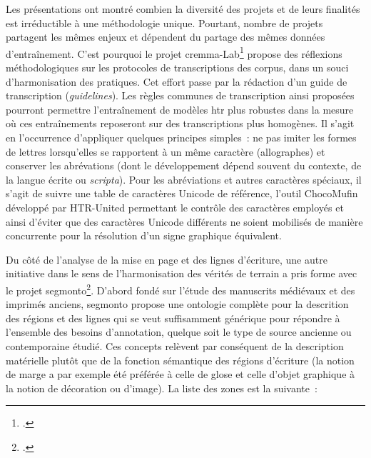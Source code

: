 \documentclass[a4paper,12pt,twoside]{book}
\begin{document}
				Les présentations ont montré combien la diversité des projets et de
				leurs finalités est irréductible à une méthodologie unique. Pourtant,
				nombre de projets partagent les mêmes enjeux et dépendent du partage des
				mêmes données d'entraînement. C'est pourquoi le projet \gls{cremma}-Lab\footcite{campsCremmaLabProjectsTranscription2022} propose des réflexions
				méthodologiques sur les protocoles de transcriptions des corpus, dans un
				souci d'harmonisation des pratiques. Cet effort passe par la rédaction
				d'un guide de transcription (\textit{guidelines}). Les règles communes de
				transcription ainsi proposées pourront permettre l'entraînement de
				modèles \gls{htr} plus robustes dans la mesure où ces entraînements reposeront
				sur des transcriptions plus homogènes. Il s'agit en l'occurrence
				d'appliquer quelques principes simples~: ne pas imiter les formes de
				lettres lorsqu'elles se rapportent à un même caractère (allographes) et
				conserver les abrévations (dont le développement dépend souvent du
				contexte, de la langue écrite ou \textit{scripta}). Pour les abréviations
				et autres caractères spéciaux, il s'agit de suivre une table de
				caractères Unicode de référence, l'outil ChocoMufin développé par
				HTR-United permettant le contrôle des caractères employés et ainsi
				d'éviter que des caractères Unicode différents ne soient mobilisés de
				manière concurrente pour la résolution d'un signe graphique équivalent.
				
				Du côté de l'analyse de la mise en page et des lignes d'écriture, une
				autre initiative dans le sens de l'harmonisation des vérités de terrain
				a pris forme avec le projet \gls{segmonto}\footcite{gabaySegmOntoControlledVocabulary2022}. D'abord fondé sur l'étude
				des manuscrits médiévaux et des imprimés anciens, \gls{segmonto} propose une
				ontologie complète pour la descrition des régions et des lignes qui se
				veut suffisamment générique pour répondre à l'ensemble des besoins
				d'annotation, quelque soit le type de source ancienne ou contemporaine
				étudié. Ces concepts relèvent par conséquent de la description
				matérielle plutôt que de la fonction sémantique des régions d'écriture
				(la notion de \og marge \fg{} a par exemple été préférée à celle de glose et
				celle d'objet \og graphique\fg{} à la notion de décoration ou d'image). La
				liste des zones est la suivante~:
				
\end{document}
